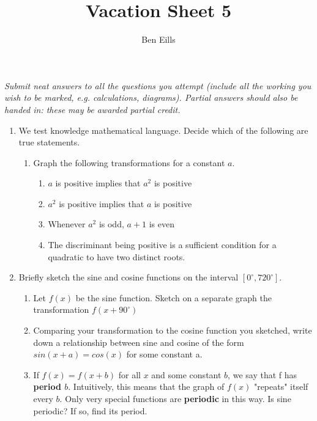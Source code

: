 \documentclass{article}
\begin{document}
\title{Vacation Sheet 5}
\author{Ben Eills}
\maketitle

\textit{Submit neat answers to all the questions you attempt (include all the working you wish to be marked, e.g. calculations, diagrams).  Partial answers should also be handed in: these may be awarded partial credit.}

\begin{enumerate}
	\item We test knowledge mathematical language.  Decide which of the following are true statements.
		\begin{enumerate}
			\item Graph the following transformations for a constant $a$.
			\begin{enumerate}
				\item $a$ is positive implies that $a^2$ is positive
				
				\item $a^2$ is positive implies that $a$ is positive
				
				\item Whenever $a^2$ is odd, $a+1$ is even
				
				\item The discriminant being positive is a sufficient condition for a quadratic to have two distinct roots.
			\end{enumerate}
		\end{enumerate}
	
	\item Briefly sketch the sine and cosine functions on the interval $[ 0^\circ, 720^\circ ]$.
		\begin{enumerate}
			\item Let $f(x)$ be the sine function.  Sketch on a separate graph the transformation $f(x + 90^\circ)$

			\item Comparing your transformation to the cosine function you sketched, write down a relationship between sine and cosine of the form \\ $sin(x + a) = cos(x)$ for some constant a.
			
			\item If $f(x) = f(x+b)$ for all $x$ and some constant $b$, we say that f has \textbf{period $b$}.  Intuitively, this means that the graph of $f(x)$ "repeats" itself every $b$.  Only very special functions are \textbf{periodic} in this way.  Is sine periodic?  If so, find its period.
			

\end{enumerate}
\end{enumerate}
\end{document}
